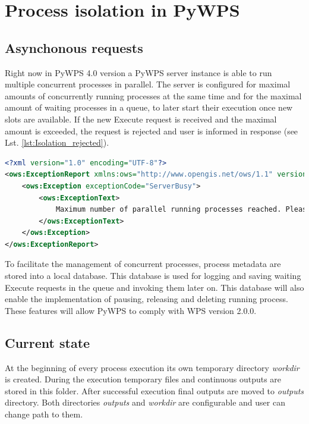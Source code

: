 \documentclass[12pt,a4paper]{article}
\begin{document}
\newpage
\section{Process isolation in PyWPS}
\subsection{Asynchonous requests}
Right now in PyWPS 4.0 version a PyWPS server instance is able to run multiple
concurrent processes in parallel. The server is configured for maximal amounts of concurrently running processes at
the same time and for the maximal amount of waiting processes in a queue, to later start their execution once new
slots are available. If the new Execute request is received and the maximal amount is exceeded, the request is rejected
and user is informed in response (see Lst. \ref{lst:Isolation_rejected}).

\begin{lstlisting}[basicstyle=\small,caption={Resource exceeded exception},language=XML,label={lst:Isolation_rejected}]
<?xml version="1.0" encoding="UTF-8"?>
<ows:ExceptionReport xmlns:ows="http://www.opengis.net/ows/1.1" version="1.0.0">
    <ows:Exception exceptionCode="ServerBusy">
        <ows:ExceptionText>
            Maximum number of parallel running processes reached. Please try later.
        </ows:ExceptionText>
    </ows:Exception>
</ows:ExceptionReport>
\end{lstlisting}

To facilitate the management of concurrent processes, process metadata are stored into a local database. This database is used
for logging and saving waiting Execute requests in the queue and invoking them later on.
This database will also enable the implementation of pausing, releasing and deleting running process. These features will
allow PyWPS to comply with WPS version 2.0.0.

\subsection{Current state}
\label{subsec:current_state}
At the beginning of every process execution its own temporary directory \textit{workdir} is created. During the execution
temporary files and continuous outputs are stored in this folder. After successful execution final outputs are
moved to \textit{outputs} directory. Both directories \textit{outputs} and \textit{workdir} are configurable and user can
change path to them.
\end{document}
